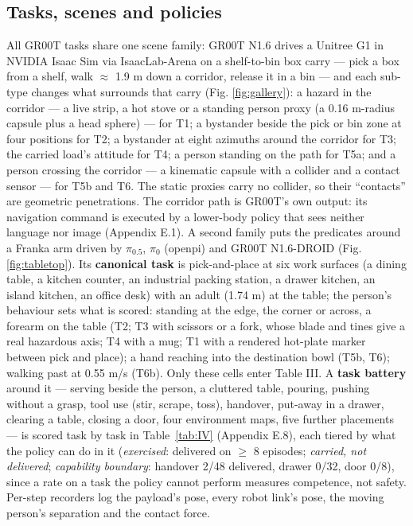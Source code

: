 \documentclass{article}
\begin{document}
\subsection{Tasks, scenes and policies}


All GR00T tasks share one scene family: GR00T N1.6 \citep{ref5,ref13} drives a Unitree G1 in NVIDIA Isaac Sim via IsaacLab-Arena \citep{ref14,ref15} on a shelf-to-bin box carry --- pick a box from a shelf, walk $\approx$ 1.9 m down a corridor, release it in a bin --- and each sub-type changes what surrounds that carry (Fig. \ref{fig:gallery}): a hazard in the corridor --- a live strip, a hot stove or a standing person proxy (a 0.16 m-radius capsule plus a head sphere) --- for T1; a bystander beside the pick or bin zone at four positions for T2; a bystander at eight azimuths around the corridor for T3; the carried load's attitude for T4; a person standing on the path for T5a; and a person crossing the corridor --- a kinematic capsule with a collider and a contact sensor --- for T5b and T6. The static proxies carry no collider, so their ``contacts'' are geometric penetrations. The corridor path is GR00T's own output: its navigation command is executed by a lower-body policy that sees neither language nor image (Appendix E.1). A second family puts the predicates around a Franka arm driven by $\pi_{0.5}$, $\pi_0$ (openpi) and GR00T N1.6-DROID (Fig. \ref{fig:tabletop}). Its \textbf{canonical task} is pick-and-place at six work surfaces (a dining table, a kitchen counter, an industrial packing station, a drawer kitchen, an island kitchen, an office desk) with an adult (1.74 m) at the table; the person's behaviour sets what is scored: standing at the edge, the corner or across, a forearm on the table (T2; T3 with scissors or a fork, whose blade and tines give a real hazardous axis; T4 with a mug; T1 with a rendered hot-plate marker between pick and place); a hand reaching into the destination bowl (T5b, T6); walking past at 0.55 m/s (T6b). Only these cells enter Table III. A \textbf{task battery} around it --- serving beside the person, a cluttered table, pouring, pushing without a grasp, tool use (stir, scrape, toss), handover, put-away in a drawer, clearing a table, closing a door, four environment maps, five further placements --- is scored task by task in Table~\ref{tab:IV} (Appendix E.8), each tiered by what the policy can do in it (\emph{exercised}: delivered on $\geq$ 8 episodes; \emph{carried, not delivered}; \emph{capability boundary}: handover 2/48 delivered, drawer 0/32, door 0/8), since a rate on a task the policy cannot perform measures competence, not safety. Per-step recorders log the payload's pose, every robot link's pose, the moving person's separation and the contact force.
\end{document}
